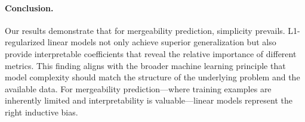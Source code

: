\paragraph{Conclusion.}
Our results demonstrate that for mergeability prediction, simplicity prevails. L1-regularized linear models not only achieve superior generalization but also provide interpretable coefficients that reveal the relative importance of different metrics. This finding aligns with the broader machine learning principle that model complexity should match the structure of the underlying problem and the available data. For mergeability prediction---where training examples are inherently limited and interpretability is valuable---linear models represent the right inductive bias.
